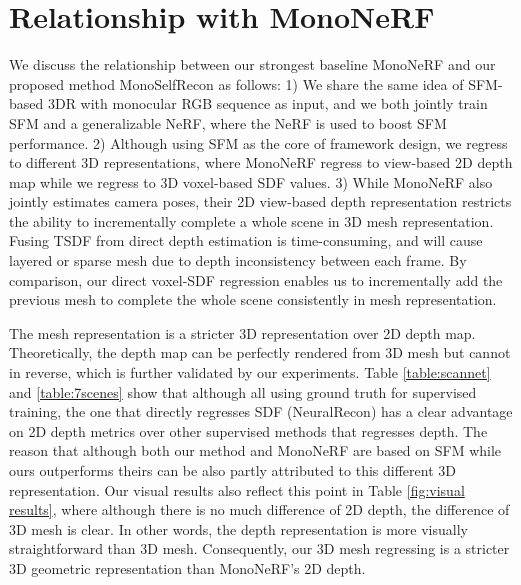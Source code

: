 \clearpage
\setcounter{page}{1}
\maketitlesupplementary


\section{Relationship with MonoNeRF \cite{mononerf}}
\label{sec:relationship with mononerf}
We discuss the relationship between our strongest baseline MonoNeRF\cite{mononerf} and our proposed method MonoSelfRecon as follows: 1) We share the same idea of SFM-based 3DR with monocular RGB sequence as input, and we both jointly train SFM and a generalizable NeRF, where the NeRF is used to boost SFM performance.  2) Although using SFM as the core of framework design, we regress to different 3D representations, where MonoNeRF regress to view-based 2D depth map while we regress to 3D voxel-based SDF values. 3) While MonoNeRF also jointly estimates camera poses, their 2D view-based depth representation restricts the ability to incrementally complete a whole scene in 3D mesh representation. Fusing TSDF from direct depth estimation is time-consuming, and will cause layered or sparse mesh due to depth inconsistency between each frame. By comparison, our direct voxel-SDF regression enables us to incrementally add the previous mesh to complete the whole scene consistently in mesh representation.  

The mesh representation is a stricter 3D representation over 2D depth map. Theoretically, the depth map can be perfectly rendered from 3D mesh but cannot in reverse, which is further validated by our experiments. Table \ref{table:scannet} and \ref{table:7scenes} show that although all using ground truth for supervised training, the one that directly regresses SDF (NeuralRecon) has a clear advantage on 2D depth metrics over other supervised methods that regresses depth. The reason that although both our method and MonoNeRF are based on SFM while ours outperforms theirs can be also partly attributed to this different 3D representation. Our visual results also reflect this point in Table \ref{fig:visual results}, where although there is no much difference of 2D depth, the difference of 3D mesh is clear. In other words, the depth representation is more visually straightforward than 3D mesh. Consequently, our 3D mesh regressing is a stricter 3D geometric representation than MonoNeRF's 2D depth.


